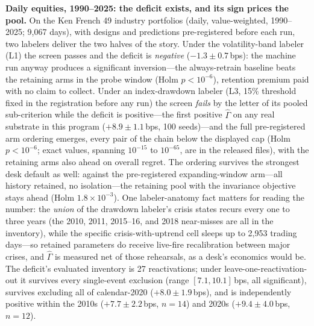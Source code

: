 \documentclass[sigconf,anonymous]{acmart}
\newcommand{\G}{\hat\Gamma}
\begin{document}
\textbf{Daily equities, 1990--2025: the deficit exists, and its sign
prices the pool.} On the Ken French 49 industry portfolios (daily,
value-weighted, 1990--2025; 9{,}067 days), with designs and predictions
pre-registered before each run, two labelers deliver the two halves of
the story. Under the volatility-band labeler (L1) the screen passes and
the deficit is \emph{negative} ($-1.3 \pm 0.7$\,bps): the machine
run anyway produces a significant inversion---the always-retrain
baseline beats the retaining arms in the probe window (Holm
$p<10^{-6}$), retention premium paid with no claim to
collect. Under an index-drawdown labeler (L3, 15\% threshold fixed in
the registration before any run) the screen \emph{fails} by the letter
of its pooled sub-criterion while the deficit is positive---the first
positive $\G$ on any real substrate in this program
($+8.9 \pm 1.1$\,bps, 100 seeds)---and the full pre-registered arm
ordering emerges, every pair of the chain below the displayed cap
(Holm $p<10^{-6}$; exact values, spanning $10^{-15}$ to $10^{-65}$,
are in the released files), with the retaining
arms also ahead on overall regret. The ordering survives the
strongest desk default as well: against the pre-registered
expanding-window arm---all history retained, no
isolation---the retaining pool with the invariance objective stays
ahead (Holm $1.8{\times}10^{-3}$). One labeler-anatomy fact matters for
reading the number: the \emph{union} of the drawdown labeler's crisis
states recurs every one to three years (the 2010, 2011, 2015--16, and
2018 near-misses are all in the inventory), while the specific
crisis-with-uptrend cell sleeps up to 2{,}953 trading days---so
retained parameters do receive live-fire recalibration between major
crises, and $\G$ is measured net of those rehearsals, as a desk's
economics would be. The deficit's evaluated inventory is
27 reactivations; under leave-one-reactivation-out it survives every
single-event exclusion (range $[7.1, 10.1]$\,bps, all significant),
survives excluding all of calendar-2020 ($+8.0 \pm 1.9$\,bps), and
is independently positive within the 2010s ($+7.7 \pm 2.2$\,bps,
$n{=}14$) and 2020s ($+9.4 \pm 4.0$\,bps, $n{=}12$).
\end{document}
